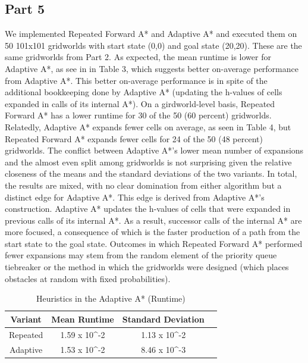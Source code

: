 \documentclass{article}
\begin{document}
\subsection*{Part 5}
We implemented Repeated Forward A* and Adaptive A* and executed them on 50 101x101 gridworlds with start state (0,0) and goal state (20,20). These are the same gridworlds from Part 2. As expected, the mean runtime is lower for Adaptive A*, as see in in Table 3, which suggests better on-average performance from Adaptive A*. This better on-average performance is in spite of the additional bookkeeping done by Adaptive A* (updating the h-values of cells expanded in calls of its internal A*). On a girdworld-level basis, Repeated Forward A* has a lower runtime for 30 of the 50 (60 percent) gridworlds. Relatedly, Adaptive A* expands fewer cells on average, as seen in Table 4, but Repeated Forward A* expands fewer cells for 24 of the 50 (48 percent) gridworlds. The conflict between Adaptive A*'s lower mean number of expansions and the almost even split among gridworlds is not surprising given the relative closeness of the means and the standard deviations of the two variants. In total, the results are mixed, with no clear domination from either algorithm but a distinct edge for Adaptive A*. This edge is derived from Adaptive A*'s construction. Adaptive A* updates the h-values of cells that were expanded in previous calls of its internal A*. As a result, successor calls of the internal A* are more focused, a consequence of which is the faster production of a path from the start state to the goal state. Outcomes in which Repeated Forward A* performed fewer expansions may stem from the random element of the priority queue tiebreaker or the method in which the gridworlds were designed (which places obstacles at random with fixed probabilities).\\

\begin{table}[!h]
    \centering
    \small
    \begin{tabular}{cccc}
        \hline
         Variant & Mean Runtime & Standard Deviation\\
         \hline
         Repeated & 1.59 x 10^{-2} & 1.13 x 10^{-2}\\
         Adaptive & 1.53 x 10^{-2} & 8.46 x 10^{-3}\\
        \hline
    \end{tabular}
    \caption{Heuristics in the Adaptive A* (Runtime)}
    \label{tab:my_label}
\end{table}
\end{document}
